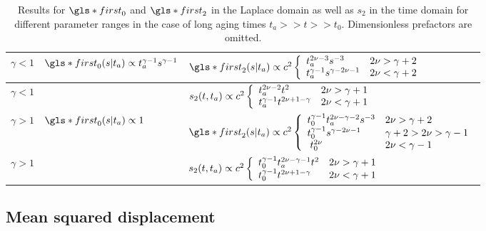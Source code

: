 \begin{center}
\begin{table}[h!]
 \begin{tabular}{||l|l|l||}
 \hline \hline
\rule[-4mm]{0cm}{1cm}   $\gamma<1$ & $ \gls*{first}_0(s|t_a) \propto t_a^{\gamma-1}s^{\gamma-1}$ & $\gls*{first}_{2}(s|t_a) \propto   c^2 \left\{ \begin{array}{l l}
  t_a^{2\nu-3}  s^{-3} & 2\nu> \gamma+2\\
  t_a^{\gamma-1} s^{\gamma-2\nu-1}  & 2\nu < \gamma+2
\end{array} 
 \right. $\\ \hline
\rule[-4mm]{0cm}{1cm} $\gamma<1$ & $  $ & $s_{2}(t,t_a) \propto  c^2 
\left\{ \begin{array}{l l}
 t_a^{2\nu-2}t^2  & 2\nu> \gamma+1\\
 t_a^{\gamma-1} t^{2\nu+1-\gamma}  & 2\nu < \gamma+1
\end{array} \right. $ \\ \hline
\rule[-4mm]{0cm}{1cm} $\gamma>1$ & $\gls*{first}_0(s|t_a) \propto  1$ & $\gls*{first}_{2}(s|t_a) \propto    c^2  
 \left\{ \begin{array}{l l}
t_0^{\gamma-1}  t_a^{2\nu-\gamma-2} s^{-3} & 2\nu> \gamma+2\\
t_0^{\gamma-1}  s^{\gamma-2\nu-1} & \gamma+2> 2\nu > \gamma -1\\
 \; t_0^{2\nu} & 2\nu < \gamma -1
\end{array} \right.$ \\ \hline
\rule[-4mm]{0cm}{1cm} $\gamma>1$& & $s_{2}(t,t_a) \propto  c^2 \left\{ \begin{array}{l l}
t_0^{\gamma-1}   t_a^{2\nu -\gamma -1}t^2 & 2\nu > \gamma +1 \\
t_0^{\gamma-1}  t^{2\nu +1 -\gamma} & 2\nu < \gamma + 1
\end{array} \right.$ \\ \hline \hline
\end{tabular}
\caption{Results for $\gls*{first}_0$ and $\gls*{first}_2$ in the Laplace domain as well as $s_2$ in the time domain for different parameter ranges in the case of long 
aging times $t_a>>t>>t_0$. Dimensionless prefactors are omitted.
\label{tab:sFstrongAging}}
\end{table}
\end{center}


\subsection*{Mean squared displacement}

